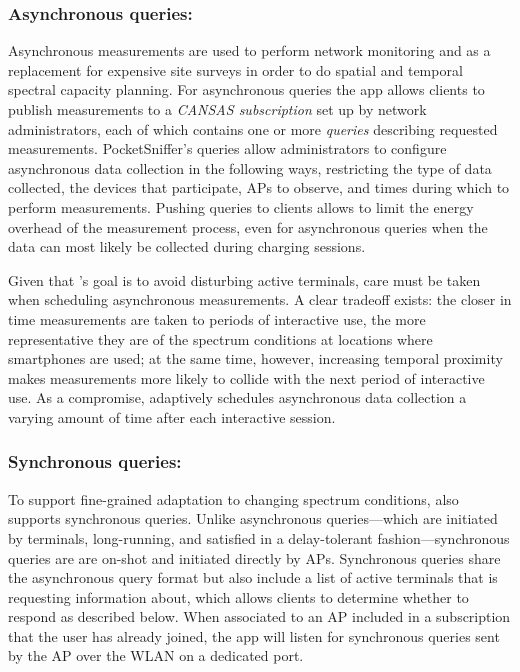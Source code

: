 \subsubsection{Asynchronous queries:\space} Asynchronous measurements are
used to perform network monitoring and as a replacement for expensive site
surveys in order to do spatial and temporal spectral capacity planning. For
asynchronous queries the \PS{} app allows clients to publish measurements to
a \textit{CANSAS subscription} set up by network administrators, each of
which contains one or more \textit{queries} describing requested
measurements. PocketSniffer's queries allow administrators to configure
asynchronous data collection in the following ways, restricting the type of
data collected, the devices that participate, APs to observe, and times
during which to perform measurements. Pushing queries to clients allows \PS{}
to limit the energy overhead of the measurement process, even for
asynchronous queries when the data can most likely be collected during
charging sessions.

Given that \PS{}'s goal is to avoid disturbing active terminals, care must be
taken when scheduling asynchronous measurements. A clear tradeoff exists: the
closer in time measurements are taken to periods of interactive use, the more
representative they are of the spectrum conditions at locations where
smartphones are used; at the same time, however, increasing temporal
proximity makes measurements more likely to collide with the next period of
interactive use. As a compromise, \PS{} adaptively schedules asynchronous
data collection a varying amount of time after each interactive session. 

\subsubsection{Synchronous queries:\space} To support fine-grained adaptation
to changing spectrum conditions, \PS{} also supports synchronous queries.
Unlike asynchronous queries---which are initiated by terminals, long-running,
and satisfied in a delay-tolerant fashion---synchronous queries are are
on-shot and initiated directly by APs. Synchronous queries share the
asynchronous query format but also include a list of active terminals that
\PS{} is requesting information about, which allows clients to determine
whether to respond as described below. When associated to an AP included in a
\PS{} subscription that the user has already joined, the \PS{} app will
listen for synchronous queries sent by the AP over the WLAN on a dedicated
port.

